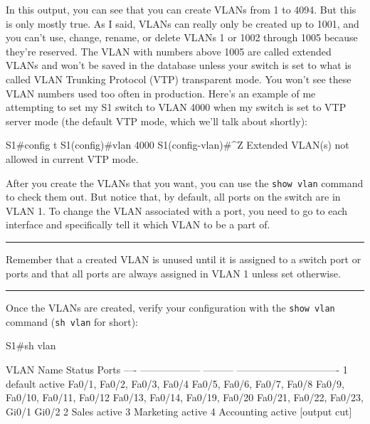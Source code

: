 \documentclass[b5paper,11pt]{memoir}
\begin{document}
In this output, you can see that you can create VLANs from 1 to 4094.
But this is only mostly true. As I said, VLANs can really only be
created up to 1001, and you can't use, change, rename, or delete VLANs 1
or 1002 through 1005 because they're reserved. The VLAN with numbers
above 1005 are called extended VLANs and won't be saved in the database
unless your switch is set to what is called VLAN Trunking Protocol (VTP)
transparent mode. You won't see these VLAN numbers used too often in
production. Here's an example of me attempting to set my S1 switch to
VLAN 4000 when my switch is set to VTP server mode (the default VTP
mode, which we'll talk about shortly):

\begin{cli}
S1#config t
S1(config)#vlan 4000
S1(config-vlan)#^Z
Extended VLAN(s) not allowed in current VTP mode.
\end{cli}

After you create the VLANs that you want, you can use the
\texttt{show\ vlan} command to check them out.
But notice that, by default, all ports on the switch are in VLAN 1.
To change the VLAN associated with a port, you need to go to each interface and specifically tell it which VLAN to be a part of.

\begin{center}\rule{0.5\linewidth}{0.5pt}\end{center}

Remember that a created VLAN is unused
until it is assigned to a switch port or ports and that all ports are
always assigned in VLAN 1 unless set otherwise.

\begin{center}\rule{0.5\linewidth}{0.5pt}\end{center}

Once the VLANs are created, verify your configuration with the
\texttt{show\ vlan} command (\texttt{sh\ vlan} for short):

\begin{cli}
S1#sh vlan

VLAN Name               Status    Ports
---- ------------------ --------- -------------------------------
1    default            active    Fa0/1, Fa0/2, Fa0/3, Fa0/4
                                  Fa0/5, Fa0/6, Fa0/7, Fa0/8
                                  Fa0/9, Fa0/10, Fa0/11, Fa0/12
                                  Fa0/13, Fa0/14, Fa0/19, Fa0/20
                                  Fa0/21, Fa0/22, Fa0/23, Gi0/1
                                  Gi0/2
2    Sales              active
3    Marketing          active
4    Accounting         active
[output cut]
\end{cli}
\end{document}
